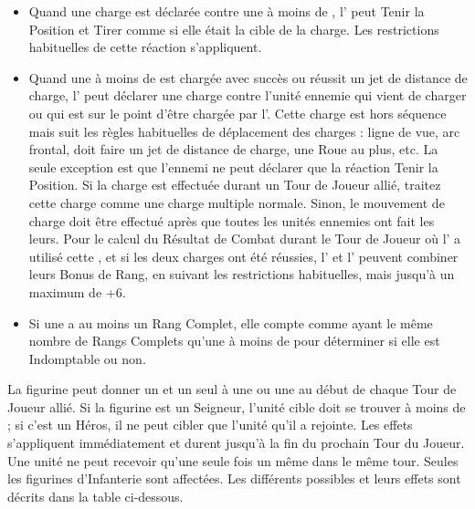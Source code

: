 \begin{itemize}[label={-}]

\item Quand une charge est déclarée contre une \parentunit{} à moins de , l'\supportunit{} peut Tenir la Position et Tirer comme si elle était la cible de la charge. Les restrictions habituelles de cette réaction s'appliquent.

\item Quand une \parentunit{} à moins de  est chargée avec succès ou réussit un jet de distance de charge, l'\supportunit{} peut déclarer une charge contre l'unité ennemie qui vient de charger ou qui est sur le point d'être chargée par l'\parentunit{}. Cette charge est hors séquence mais suit les règles habituelles de déplacement des charges : ligne de vue, arc frontal, doit faire un jet de distance de charge, une Roue au plus, etc. La seule exception est que l'ennemi ne peut déclarer que la réaction Tenir la Position. Si la charge est effectuée durant un Tour de Joueur allié, traitez cette charge comme une charge multiple normale. Sinon, le mouvement de charge doit être effectué après que toutes les unités ennemies ont fait les leurs. Pour le calcul du Résultat de Combat durant le Tour de Joueur où l'\supportunit{} a utilisé cette \supportingaction{}, et si les deux charges ont été réussies, l'\supportunit{} et l'\parentunit{} peuvent combiner leurs Bonus de Rang, en suivant les restrictions habituelles, mais jusqu'à un maximum de +6.

\item Si une \supportunit{} a au moins un Rang Complet, elle compte comme ayant le même nombre de Rangs Complets qu'une \parentunit{} à moins de  pour déterminer si elle est Indomptable ou non.

\end{itemize}

\armyspecialruleentry{\orders}

La figurine peut donner un et un seul \order{} à une \parentunit{} ou une \supportunit{} au début de chaque Tour de Joueur allié. Si la figurine est un Seigneur, l'unité cible doit se trouver à moins de  ; si c'est un Héros, il ne peut cibler que l'unité qu'il a rejointe. Les effets s'appliquent immédiatement et durent jusqu'à la fin du prochain Tour du Joueur. Une unité ne peut recevoir qu'une seule fois un même \order{} dans le même tour. Seules les figurines d'Infanterie sont affectées. Les différents \orders{} possibles et leurs effets sont décrits dans la table ci-dessous.

